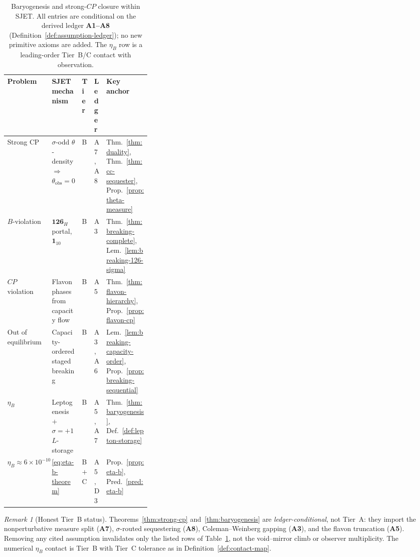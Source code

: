 \documentclass[aps,prd,onecolumn,amsmath,amssymb,nofootinbib,11pt]{revtex4-2}
\numberwithin{equation}{section}
\theoremstyle{plain}
\theoremstyle{definition}
\theoremstyle{remark}
\newtheorem{remark}[theorem]{Remark}
\begin{document}
\begin{table}[ht]
\centering
\small
\renewcommand{\arraystretch}{1.14}
\begin{tabular}{@{}llllp{0.34\linewidth}@{}}
\toprule
\textbf{Problem} & \textbf{SJET mechanism} & \textbf{Tier} &
\textbf{Ledger} & \textbf{Key anchor} \\
\midrule
Strong CP &
  $\sigma$-odd $\theta$-density $\Rightarrow$
  $\theta_{\mathrm{obs}}=0$ &
  B &
  A7, A8 &
  Thm.~\ref{thm:duality},
  Thm.~\ref{thm:cc-sequester},
  Prop.~\ref{prop:theta-measure} \\
\addlinespace
$B$-violation &
  $\mathbf{126}_H$ portal, $\mathbf{1}_{10}$ &
  B &
  A3 &
  Thm.~\ref{thm:breaking-complete},
  Lem.~\ref{lem:breaking-126-sigma} \\
\addlinespace
$CP$ violation &
  Flavon phases from capacity flow &
  B &
  A5 &
  Thm.~\ref{thm:flavon-hierarchy},
  Prop.~\ref{prop:flavon-cp} \\
\addlinespace
Out of equilibrium &
  Capacity-ordered staged breaking &
  B &
  A3, A6 &
  Lem.~\ref{lem:breaking-capacity-order},
  Prop.~\ref{prop:breaking-sequential} \\
\addlinespace
$\eta_B$ &
  Leptogenesis $+$ $\sigma=+1$ $L$-storage &
  B &
  A5, A7 &
  Thm.~\ref{thm:baryogenesis},
  Def.~\ref{def:lepton-storage} \\
\addlinespace
$\eta_B\approx 6\times 10^{-10}$ &
  \eqref{eq:eta-b-theorem} &
  B $+$ C &
  A5, D3 &
  Prop.~\ref{prop:eta-b},
  Pred.~\ref{pred:eta-b} \\
\bottomrule
\end{tabular}
\caption{Baryogenesis and strong-$CP$ closure within SJET. All entries are
conditional on the derived ledger \textbf{A1--A8}
(Definition~\ref{def:assumption-ledger}); no new primitive axioms are added.
The $\eta_B$ row is a leading-order Tier~B/C contact with observation.}
\label{tab:baryogenesis}
\end{table}

\begin{remark}[Honest Tier~B status]
Theorems~\ref{thm:strong-cp} and~\ref{thm:baryogenesis} are
\emph{ledger-conditional}, not Tier~A: they import the nonperturbative measure
split (\textbf{A7}), $\sigma$-routed sequestering (\textbf{A8}), Coleman--Weinberg
gapping (\textbf{A3}), and the flavon truncation (\textbf{A5}). Removing any
cited assumption invalidates only the listed rows of
Table~\ref{tab:baryogenesis}, not the void--mirror climb or observer
multiplicity. The numerical $\eta_B$ contact is Tier~B with Tier~C tolerance
as in Definition~\ref{def:contact-map}.
\end{remark}%
\end{document}
